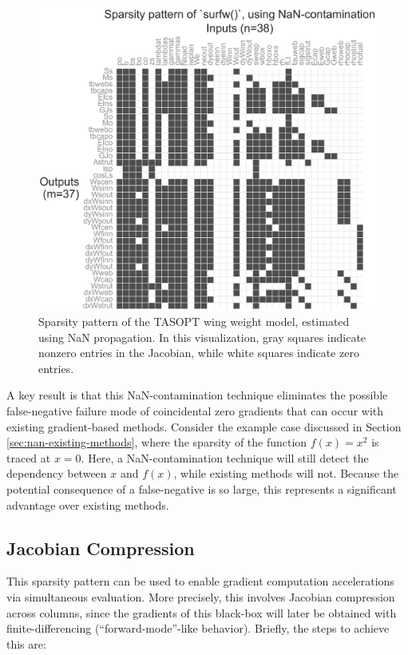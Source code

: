 \begin{figure}[H]
    \centering
    \includegraphics[width=6in]{../figures/nan-propagation/image2-crop.png}
    \caption{Sparsity pattern of the TASOPT wing weight model, estimated using NaN propagation. In this visualization, gray squares indicate nonzero entries in the Jacobian, while white squares indicate zero entries.}
    \label{fig:nan-jacobian}
\end{figure}

A key result is that this NaN-contamination technique eliminates the possible false-negative failure mode of coincidental zero gradients that can occur with existing gradient-based methods. Consider the example case discussed in Section \ref{sec:nan-existing-methods}, where the sparsity of the function $f(x) = x^2$ is traced at $x=0$. Here, a NaN-contamination technique will still detect the dependency between $x$ and $f(x)$, while existing methods will not. Because the potential consequence of a false-negative is so large, this represents a significant advantage over existing methods.

\subsection{Jacobian Compression}
\label{sec:nan-jacobian-compression}

This sparsity pattern can be used to enable gradient computation accelerations via simultaneous evaluation. More precisely, this involves Jacobian compression across columns, since the gradients of this black-box will later be obtained with finite-differencing (``forward-mode''-like behavior). Briefly, the steps to achieve this are:

